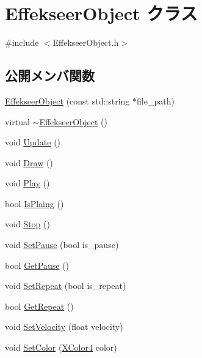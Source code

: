 \hypertarget{class_effekseer_object}{}\section{Effekseer\+Object クラス}
\label{class_effekseer_object}


{\ttfamily \#include $<$Effekseer\+Object.\+h$>$}

\subsection*{公開メンバ関数}
\begin{DoxyCompactItemize}
\item 
\mbox{\hyperlink{class_effekseer_object_a8e1e081f62efa87b31e00bcfd9cf1a45}{Effekseer\+Object}} (const std\+::string $\ast$file\+\_\+path)
\item 
virtual \mbox{\hyperlink{class_effekseer_object_a0463ba508e3c83576991138465847054}{$\sim$\+Effekseer\+Object}} ()
\item 
void \mbox{\hyperlink{class_effekseer_object_aecb9314a5ff922c9420301129d2f26f7}{Update}} ()
\item 
void \mbox{\hyperlink{class_effekseer_object_adc628e5089ca0cdc418e92729943a3b2}{Draw}} ()
\item 
void \mbox{\hyperlink{class_effekseer_object_a59c8a12b4eb558449622660d892b3cf4}{Play}} ()
\item 
bool \mbox{\hyperlink{class_effekseer_object_a6fe253dd3387bdfd9305878ff194f305}{Is\+Plaing}} ()
\item 
void \mbox{\hyperlink{class_effekseer_object_adfbdfbe202b78441b33d76656453e536}{Stop}} ()
\item 
void \mbox{\hyperlink{class_effekseer_object_aeec933c68ceb4bafc69d65590c470d72}{Set\+Pause}} (bool is\+\_\+pause)
\item 
bool \mbox{\hyperlink{class_effekseer_object_a482a0e824d8719b7676ae15948ae7348}{Get\+Pause}} ()
\item 
void \mbox{\hyperlink{class_effekseer_object_a77122f2d71d44d6cceec2b6bdedb4b2a}{Set\+Repeat}} (bool is\+\_\+repeat)
\item 
bool \mbox{\hyperlink{class_effekseer_object_a3c44b29c016fb5b3618e2d39060844be}{Get\+Repeat}} ()
\item 
void \mbox{\hyperlink{class_effekseer_object_a3c14fd4215640b648b14e445b99564f7}{Set\+Velocity}} (float velocity)
\item 
void \mbox{\hyperlink{class_effekseer_object_a876c50dad7f959d77579b1ea274ea706}{Set\+Color}} (\mbox{\hyperlink{_vector3_d_8h_a680c30c4a07d86fe763c7e01169cd6cc}{X\+Color4}} color)

\end{DoxyCompactItemize}
